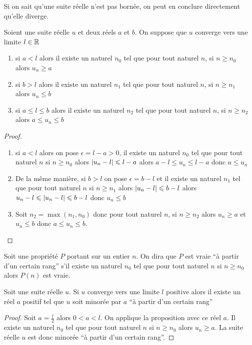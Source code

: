 Si on sait qu'une suite réelle n'est pas bornée, on peut en conclure directement qu'elle diverge.
\begin{prop}
  Soient une suite réelle $u$ et deux réels $a$ et $b$. On suppose que $u$ converge vers une limite $l\in\mathbb{R}$
  \begin{enumerate}
  \item si $a<l$ alors il existe un naturel $n_0$ tel que pour tout naturel $n$, si $n\geqslant n_0$ alors $u_n\geqslant a$
  \item si $b>l$ alors il existe un naturel $n_1$ tel que pour tout naturel $n$, si $n\geqslant n_1$ alors $u_n\leqslant b$
  \item si $a\leqslant l\leqslant b$ alors il existe un naturel $n_2$ tel que pour tout naturel $n$, si $n\geqslant n_2$ alors $a \leqslant u_n \leqslant b$
  \end{enumerate}
\end{prop}
\begin{proof}
  \begin{enumerate}
  \item si $a<l$ alors on pose $\epsilon=l-a>0$, il existe un naturel $n_0$ tel que pour tout naturel $n$ si $n \geqslant n_0$ alors $\left\lvert u_n-l\right\rvert\leqslant l-a$ alors $a-l \leqslant u_n \leqslant l-a$ donc $a \leqslant u_n$
  \item De la même manière, si $b>l$ on pose $\epsilon=b-l$ et il existe un naturel $n_1$ tel que pour tout naturel $n$ si $n \geqslant n_1$ alors $\left\lvert u_n-l\right\rvert \leqslant b-l$ alors $u_n-l \leqslant \left\lvert u_n-l\right\rvert\leqslant b-l$ donc $u_n \leqslant b$
  \item Soit $n_2=\max(n_1,n_0)$ donc pour tout naturel $n$, si $n \geqslant n_2$ alors $u_n \geqslant a$ et $u_n \leqslant b$ donc $a \leqslant u_n \leqslant b$.
  \end{enumerate}
\end{proof}
\begin{defdef}
  Soit une propriété $P$ portant sur un entier $n$. On dira que $P$ est vraie ``à partir d'un certain rang'' s'il existe un naturel $n_0$ tel que pour tout naturel $n$ si $n\geqslant n_0$ alors $P(n)$ est vraie.
\end{defdef}
\begin{cor}
  Soit une suite réelle $u$. Si $u$ converge vers une limite $l$ positive alors il existe un réel $a$ positif tel que $u$ soit minorée par $a$ ``à partir d'un certain rang''
\end{cor}
\begin{proof}
  Soit $a=\frac{l}{2}$ alors $0<a<l$. On applique la proposition avec ce réel $a$. Il existe un naturel $n_0$ tel que pour tout naturel $n$ si $n \geqslant n_0$ alors $u_n \geqslant a$. La suite réelle $u$ est donc minorée ``à partir d'un certain rang''.
\end{proof}
